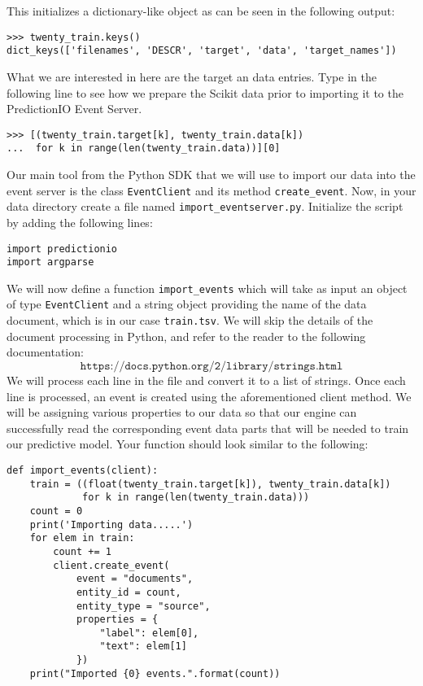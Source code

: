\documentclass[a4paper,12pt]{article}
\renewcommand{\tt}[1]{\texttt{#1}}
\newcommand{\3}{\left}
\newcommand{\4}{\right}
\renewcommand{\-}[1]{{}^{-#1}}
\begin{document}
This initializes a dictionary-like object as can be seen in the following output:

\begin{verbatim}
>>> twenty_train.keys()
dict_keys(['filenames', 'DESCR', 'target', 'data', 'target_names'])
\end{verbatim}

What we are interested in here are the target an data entries. Type in the following line to see how we prepare the Scikit data prior to importing it to the PredictionIO Event Server.

\begin{verbatim}
>>> [(twenty_train.target[k], twenty_train.data[k]) 
...  for k in range(len(twenty_train.data))][0]
\end{verbatim}

Our main tool from the Python SDK that we will use to import our data into the event server is the class \tt{EventClient} and its method \tt{create\_event}. Now, in your data directory create a file named \tt{import\_eventserver.py}. Initialize the script by adding the following lines:
\begin{verbatim}
import predictionio
import argparse
\end{verbatim}
We will now define a function \tt{import\_events} which will take as input an object of type \tt{EventClient} and a string object providing the name of the data document, which is in our case \tt{train.tsv}. We will skip the details of the document processing in Python, and refer to the reader to the following documentation:
$$
\tt{https://docs.python.org/2/library/strings.html}
$$
We will process each line in the file and convert it to a list of strings. Once each line is processed, an event is created using the aforementioned client method. We will be assigning various properties to our data so that our engine can successfully read the corresponding event data parts that will be needed to train our predictive model. Your function should look similar to the following:
\begin{verbatim}
def import_events(client):
    train = ((float(twenty_train.target[k]), twenty_train.data[k])
             for k in range(len(twenty_train.data)))
    count = 0
    print('Importing data.....')
    for elem in train:
        count += 1
        client.create_event(
            event = "documents",
            entity_id = count,
            entity_type = "source",
            properties = {
                "label": elem[0],
                "text": elem[1]
            })
    print("Imported {0} events.".format(count))
\end{verbatim}
\end{document}
